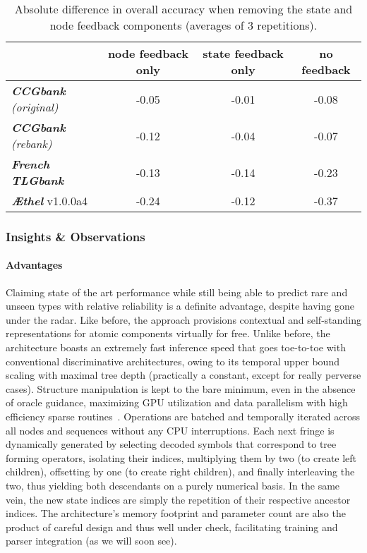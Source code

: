 \begin{table}
    \centering
    {\small
    \begin{tabular}{@{}l@{\qquad}ccc@{}}
        &  {node feedback only}  & {state feedback only} & {no feedback} \\
        \toprule
        \textit{\textbf{CCGbank} (original)} & -0.05 & -0.01 & -0.08 \\ 
        \textit{\textbf{CCGbank} (rebank)} & -0.12 & -0.04 & -0.07 \\
        \textit{\textbf{French TLGbank}} & -0.13 & -0.14 & -0.23 \\
        \textit{\textbf{\AE thel}} v1.0.0a4 & -0.24 & -0.12 & -0.37
    \end{tabular}}
    \caption{Absolute difference in overall accuracy when removing the state and node feedback components (averages of 3 repetitions).}
    \label{table:ablations}
\end{table}


\subsubsection{Insights \& Observations}
\paragraph{Advantages}
Claiming state of the art performance while still being able to predict rare and unseen types with relative reliability is a definite advantage, despite having gone under the radar.
Like before, the approach provisions contextual and self-standing representations for atomic components virtually for free.
Unlike before, the architecture boasts an extremely fast inference speed that goes toe-to-toe with conventional discriminative architectures, owing to its temporal upper bound scaling with maximal tree depth (practically a constant, except for really perverse cases).
Structure manipulation is kept to the bare minimum, even in the absence of oracle guidance, maximizing GPU utilization and data parallelism with high efficiency sparse routines~\cite{fey2019fast}.
Operations are batched and temporally iterated across all nodes and sequences without any CPU interruptions.
Each next fringe is dynamically generated by selecting decoded symbols that correspond to tree forming operators, isolating their indices, multiplying them by two (to create left children), offsetting by one (to create right children), and finally interleaving the two, thus yielding both descendants on a purely numerical basis.
In the same vein, the new state indices are simply the repetition of their respective ancestor indices.
The architecture's memory footprint and parameter count are also the product of careful design and thus well under check, facilitating training and parser integration (as we will soon see).

